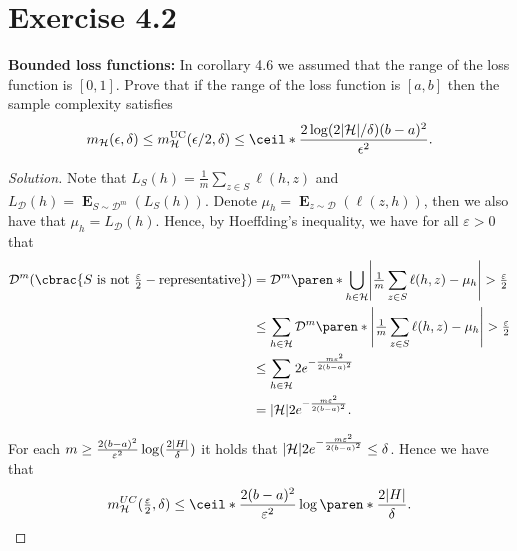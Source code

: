 \documentclass[10pt, a4paper, twoside]{amsart}
\DeclarePairedDelimiter\abs{\lvert}{\rvert}
\DeclarePairedDelimiter\cbrac\{\}
\DeclarePairedDelimiter\paren()
\DeclarePairedDelimiter{\ceil}\lceil\rceil
\newcommand{\Ev}{\operatorname*{\ensuremath{\mathbf{E}}}} %
\newenvironment{solution}
               {\let\oldqedsymbol=\qedsymbol
                \renewcommand{\qedsymbol}{$\blacktriangleleft$}
                \begin{proof}[Solution]}
               {\end{proof}
                \renewcommand{\qedsymbol}{\oldqedsymbol}}
\begin{document}
\section*{Exercise 4.2}
\textbf{Bounded loss functions:}
In corollary 4.6 we assumed that the range of the loss function is $[0,1]$. Prove that if the range of the loss function is $[a,b]$ then the sample complexity satisfies
\begin{equation*}
  m_{\mathcal{H}}(\epsilon , \delta) \leq m_{\mathcal{H}}^{\text{UC}}(\epsilon /2, \delta)
  \leq \ceil*{\frac{2\log (2|\mathcal{H}|/\delta) (b-a)^2}{\epsilon^2}} .
\end{equation*}
\begin{solution}
Note that $L_S(h)=\tfrac{1}{m}\sum_{z \in S}\ell(h,z)$ and $L_{\mathcal{D}}(h)=\Ev_{S \sim \mathcal{D}^m}(L_S(h))$.
Denote $\mu_h=\Ev_{z \sim \mathcal{D}}(\ell(z, h))$, then we also have that $\mu_h=L_{\mathcal{D}}(h)$.
Hence, by Hoeffding's inequality, we have for all $\varepsilon > 0$ that
\begin{align*}
  \mathcal{D}^m(\cbrac{S \text{ is not }\tfrac{\varepsilon}{2}-\text{representative}}) 
  &=\mathcal{D}^{m}\paren*{\bigcup_{h \in \mathcal{H}}\abs*{\tfrac{1}{m}\sum_{z \in S}\ell(h,z)-\mu_h}>\tfrac{\varepsilon}{2}} \\
  &\leq \sum_{h \in \mathcal{H}}\mathcal{D}^{m}\paren*{\abs*{\tfrac{1}{m}\sum_{z \in S}\ell(h,z)-\mu_h}>\tfrac{\varepsilon}{2}} \\
  &\leq \sum_{h \in \mathcal{H}} 2e^{-\frac{m\varepsilon^2}{2(b-a)^2}} \\
  &= \abs{\mathcal{H}} 2e^{-\frac{m\varepsilon^2}{2(b-a)^2}}.
  \end{align*}

 For each $m \geq  \frac{2(b-a)^2}{\varepsilon^2}\log(\frac{2\abs{H}}{\delta})$ it holds that
 $\abs{\mathcal{H}} 2e^{-\frac{m\varepsilon^2}{2(b-a)^2}} \leq \delta$.
 Hence we have that 
 \begin{equation*}
 m_{\mathcal{H}}^{UC}(\tfrac{\varepsilon}{2},\delta) \leq \ceil*{\frac{2(b-a)^2}{\varepsilon^2}\log\paren*{\frac{2\abs{H}}{\delta}}}.
 \end{equation*}

 
  
\end{solution}
\end{document}
